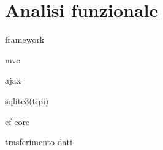 \section{Analisi funzionale}
framework

mvc 

ajax

sqlite3(tipi)

ef core

trasferimento dati

\lipsum[1]